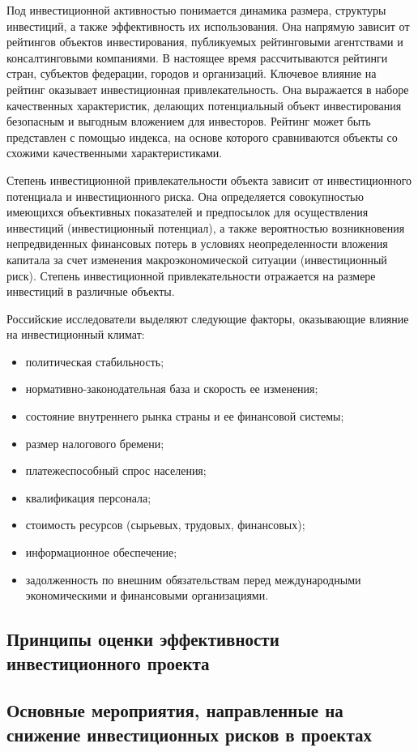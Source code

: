 Под инвестиционной активностью понимается динамика размера, структуры инвестиций, а также эффективность их использования.
Она напрямую зависит от рейтингов объектов инвестирования, публикуемых рейтинговыми агентствами и консалтинговыми компаниями.
В настоящее время рассчитываются рейтинги стран, субъектов федерации, городов и организаций.
Ключевое влияние на рейтинг оказывает инвестиционная привлекательность.
Она выражается в наборе качественных характеристик, делающих потенциальный объект  инвестирования безопасным и выгодным вложением для инвесторов.
Рейтинг может быть представлен с помощью индекса, на основе которого сравниваются объекты со схожими качественными характеристиками.

Степень инвестиционной привлекательности объекта зависит от инвестиционного потенциала и инвестиционного риска.
Она определяется совокупностью имеющихся объективных показателей и предпосылок для осуществления инвестиций (инвестиционный потенциал), а также вероятностью возникновения непредвиденных финансовых потерь в условиях неопределенности вложения капитала за счет изменения макроэкономической ситуации (инвестиционный риск).
Степень инвестиционной привлекательности отражается на размере инвестиций в различные объекты.

Российские исследователи выделяют следующие факторы, оказывающие влияние на инвестиционный климат:
\begin{itemize}
	\setlength\itemsep{1em}
	\item политическая стабильность;
	\item нормативно-законодательная база и скорость ее изменения;
	\item состояние внутреннего рынка страны и ее финансовой системы;
	\item размер налогового бремени;
	\item платежеспособный спрос населения;
	\item квалификация персонала;
	\item стоимость ресурсов (сырьевых, трудовых, финансовых);
	\item информационное обеспечение;
	\item задолженность по внешним обязательствам перед международными экономическими и финансовыми организациями.
\end{itemize}

















\subsection{Принципы оценки эффективности инвестиционного проекта}
\subsection{Основные мероприятия, направленные на снижение инвестиционных рисков в проектах}